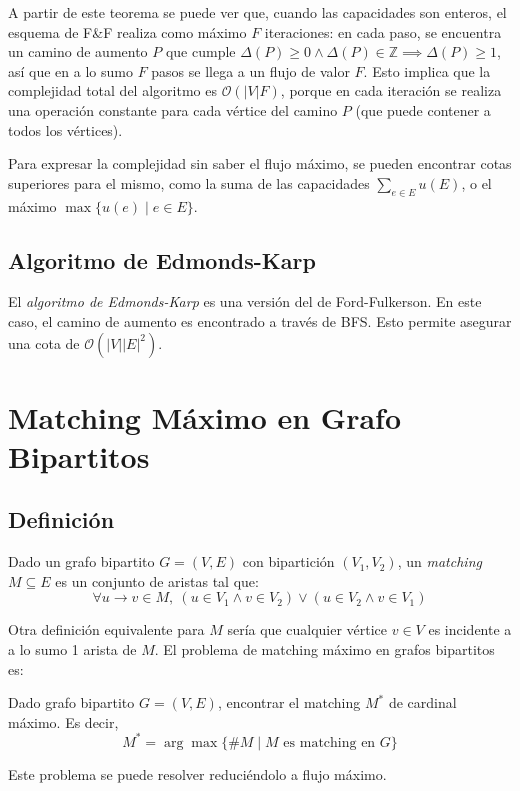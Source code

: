 \documentclass[a4paper]{report}
\newcommand{\BigO}[1]{\ensuremath{\mathcal{O}(#1)}}
\newcommand{\Z}{\mathbb{Z}}
\begin{document}
A partir de este teorema se puede ver que, cuando las capacidades son enteros, el esquema de F\&F realiza como máximo $F$ iteraciones: en cada paso, se encuentra un camino de aumento $P$ que cumple $\Delta(P) \geq 0 \land \Delta(P) \in \Z \implies \Delta(P) \geq 1$, así que en a lo sumo $F$ pasos se llega a un flujo de valor $F$. Esto implica que la complejidad total del algoritmo es \BigO{|V|F}, porque en cada iteración se realiza una operación constante para cada vértice del camino $P$ (que puede contener a todos los vértices).

Para expresar la complejidad sin saber el flujo máximo, se pueden encontrar cotas superiores para el mismo, como la suma de las capacidades $\sum_{e \in E} u(E)$, o el máximo $\max{\{u(e) \mid e \in E\}}$.

\subsection{Algoritmo de Edmonds-Karp}
\label{edmonds-karp}

El \textit{algoritmo de Edmonds-Karp} es una versión del de Ford-Fulkerson. En este caso, el camino de aumento es encontrado a través de BFS. Esto permite asegurar una cota de \BigO{|V||E|^2}.

\section{Matching Máximo en Grafo Bipartitos}

\subsection{Definición}

Dado un grafo bipartito $G = (V, E)$ con bipartición $(V_1, V_2)$, un \textit{matching} $M \subseteq E$ es un conjunto de aristas tal que:
$$\forall u \rightarrow v \in M,\ (u \in V_1 \land v \in V_2) \lor (u \in V_2 \land v \in V_1)$$

Otra definición equivalente para $M$ sería que cualquier vértice $v \in V$ es incidente a a lo sumo 1 arista de $M$. El problema de matching máximo en grafos bipartitos es:

\begin{problema}
    Dado grafo bipartito $G = (V, E)$, encontrar el matching $M^*$ de cardinal máximo. Es decir,
    $$M^* = \arg\max{\{\#M \mid M \text{ es matching en } G\}}$$
\end{problema}

Este problema se puede resolver reduciéndolo a flujo máximo.
\end{document}
